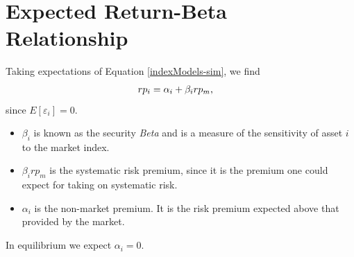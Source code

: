 \documentclass[letterpaper,10pt,english]{sphinxmanual}
\begin{document}
\section{Expected Return-Beta Relationship}
\label{indexModels:expected-return-beta-relationship}
Taking expectations of Equation \eqref{indexModels-sim}, we find
\begin{gather}
\begin{split}rp_i & = \alpha_i + \beta_i rp_m,\end{split}\notag
\end{gather}
since $E[\varepsilon_i] = 0$.
\begin{itemize}
\item {} 
$\beta_i$ is known as the security \emph{Beta} and is a measure of
the sensitivity of asset $i$ to the market index.

\end{itemize}
\begin{itemize}
\item {} 
$\beta_i rp_m$ is the systematic risk premium, since it is the
premium one could expect for taking on systematic risk.

\end{itemize}
\begin{itemize}
\item {} 
$\alpha_i$ is the non-market premium. It is the risk premium
expected above that provided by the market.

\end{itemize}

In equilibrium we expect $\alpha_i = 0$.
\end{document}
